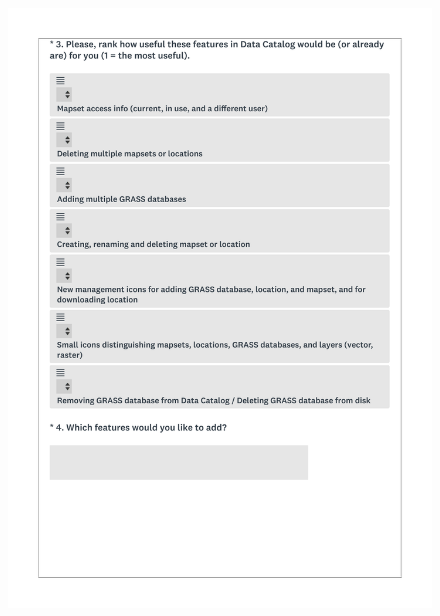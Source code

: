 \documentclass[a4paper,10pt,twoside]{article}
\begin{document}
 \newpage
 \begin{figure}[hbt!]
 \begin{center}
 \includegraphics[width=16cm]{../surveys/questionnaires/survey1_part1_page5_questions3_4.pdf}
 \end{center}
 \end{figure}
 
\end{document}
